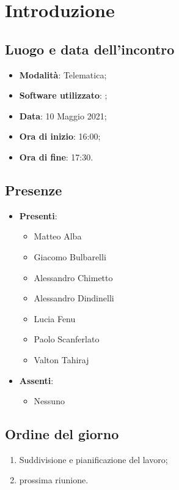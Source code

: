 \documentclass[]{article}
\begin{document}
	

	\newpage


		\section{Introduzione}
		\subsection{Luogo e data dell'incontro}
		\begin{itemize}
			\item \textbf{Modalità}: Telematica;
			\item \textbf{Software utilizzato}: ;
			\item \textbf{Data}: 10 Maggio 2021;
			\item \textbf{Ora di inizio}: 16:00;
			\item \textbf{Ora di fine}: 17:30.
		\end{itemize}

		\subsection{Presenze}
		\begin{itemize}
			\item \textbf{Presenti}:
			\begin{itemize}
				\item Matteo Alba
				\item Giacomo Bulbarelli
				\item Alessandro Chimetto
				\item Alessandro Dindinelli
				\item Lucia Fenu
				\item Paolo Scanferlato
				\item Valton Tahiraj
			\end{itemize}
			\item \textbf{Assenti}:
			\begin{itemize}
				\item Nessuno
			\end{itemize}
		\end{itemize}


		\subsection{Ordine del giorno}
		\begin{enumerate}
			\item Suddivisione e pianificazione del lavoro; 
			\item prossima riunione.
		\end{enumerate}
\end{document}
